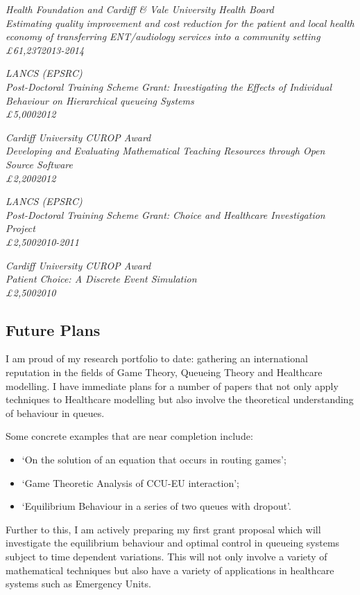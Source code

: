 \documentclass{article}
\begin{document}
\sl{Health Foundation and Cardiff \& Vale University Health Board}\\
Estimating quality improvement and cost reduction for the patient and local health economy of transferring ENT/audiology services into a community setting\\
\pounds61,237\hfill{2013-2014}


\sl{LANCS (EPSRC)}\\
Post-Doctoral Training Scheme Grant: Investigating the Effects of Individual Behaviour on Hierarchical queueing Systems\\
\pounds5,000\hfill{2012}


\sl{Cardiff University CUROP Award}\\
Developing and Evaluating Mathematical Teaching Resources through Open Source Software\\
\pounds2,200\hfill{2012}

\sl{LANCS (EPSRC)}\\
Post-Doctoral Training Scheme Grant: Choice and Healthcare Investigation Project\\
\pounds2,500\hfill{2010-2011}

\sl{Cardiff University CUROP Award}\\
Patient Choice: A Discrete Event Simulation\\
\pounds2,500\hfill{2010}

\subsection{Future Plans}

I am proud of my research portfolio to date: gathering an international reputation in the fields of Game Theory, Queueing Theory and Healthcare modelling.
I have immediate plans for a number of papers that not only apply techniques to Healthcare modelling but also involve the theoretical understanding of behaviour in queues.

Some concrete examples that are near completion include:

\begin{itemize}
    \item `On the solution of an equation that occurs in routing games';
    \item `Game Theoretic Analysis of CCU-EU interaction';
    \item `Equilibrium Behaviour in a series of two queues with dropout'.
\end{itemize}

Further to this, I am actively preparing my first grant proposal which will investigate the equilibrium behaviour and optimal control in queueing systems subject to time dependent variations.
This will not only involve a variety of mathematical techniques but also have a variety of applications in healthcare systems such as Emergency Units.
\end{document}
